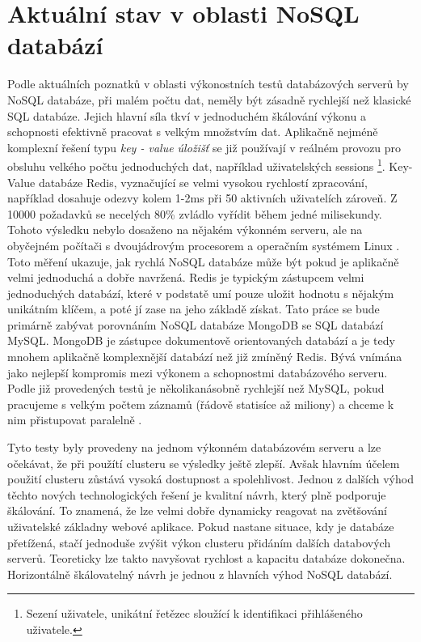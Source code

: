\section{Aktuální stav v oblasti NoSQL databází}
Podle aktuálních poznatků v oblasti výkonostních testů databázových serverů by NoSQL databáze, při malém počtu dat, neměly být zásadně rychlejší než klasické SQL databáze. Jejich hlavní síla tkví v jednoduchém škálování výkonu a schopnosti efektivně pracovat s velkým množstvím dat. Aplikačně nejméně komplexní řešení typu \emph{key - value úložišť} se již používají v reálném provozu pro obsluhu velkého počtu jednoduchých dat, například uživatelských sessions \footnote{Sezení uživatele, unikátní řetězec sloužící k identifikaci přihlášeného uživatele.}. Key-Value databáze Redis, vyznačující se velmi vysokou rychlostí zpracování, například dosahuje odezvy kolem 1-2ms při 50 aktivních uživatelích zároveň. Z 10000 požadavků se necelých 80\% zvládlo vyřídit během jedné milisekundy. Tohoto výsledku nebylo dosaženo na nějakém výkonném serveru, ale na obyčejném počítači s dvoujádrovým procesorem a operačním systémem Linux \cite{redisBenchmark}. Toto měření ukazuje, jak rychlá NoSQL databáze může být pokud je aplikačně velmi jednoduchá a dobře navržená. Redis je typickým zástupcem velmi jednoduchých databází, které v podstatě umí pouze uložit hodnotu s nějakým unikátním klíčem, a poté jí zase na jeho základě získat. Tato práce se bude primárně zabývat porovnáním NoSQL databáze MongoDB se SQL databází MySQL. MongoDB je zástupce dokumentově orientovaných databází a je tedy mnohem aplikačně komplexnější databází než již zmíněný Redis. Bývá vnímána jako nejlepší kompromis mezi výkonem a schopnostmi databázového serveru. Podle již provedených testů je několikanásobně rychlejší než MySQL, pokud pracujeme s velkým počtem záznamů (řádově statisíce až miliony) a chceme k nim přistupovat paralelně \cite{nosqlBenchmark}.

Tyto testy byly provedeny na jednom výkonném databázovém serveru a lze očekávat, že při použítí clusteru se výsledky ještě zlepší. Avšak hlavním účelem použití clusteru zůstává vysoká dostupnost a spolehlivost. Jednou z dalších výhod těchto nových technologických řešení je kvalitní návrh, který plně podporuje škálování. To znamená, že lze velmi dobře dynamicky reagovat na zvětšování uživatelské základny webové aplikace. Pokud nastane situace, kdy je databáze přetížená, stačí jednoduše zvýšit výkon clusteru přidáním dalších databových serverů. Teoreticky lze takto navyšovat rychlost a kapacitu databáze dokonečna. Horizontálně škálovatelný návrh je jednou z hlavních výhod NoSQL databází.

